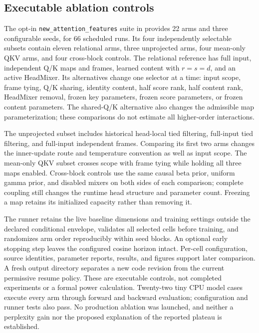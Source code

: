 \documentclass[11pt,letterpaper]{article}
\theoremstyle{remark}
\begin{document}
\subsection{Executable ablation controls}
The opt-in \texttt{new\_attention\_features} suite in  provides 22 arms and three configurable seeds, for 66 scheduled runs. Its four independently selectable subsets contain eleven relational arms, three unprojected arms, four mean-only QKV arms, and four cross-block controls. The relational reference has full input, independent Q/K maps and frames, learned content with $r=s=d$, and an active HeadMixer. Its alternatives change one selector at a time: input scope, frame tying, Q/K sharing, identity content, half score rank, half content rank, HeadMixer removal, frozen key parameters, frozen score parameters, or frozen content parameters. The shared-Q/K alternative also changes the admissible map parameterization; these comparisons do not estimate all higher-order interactions.

The unprojected subset includes historical head-local tied filtering, full-input tied filtering, and full-input independent frames. Comparing its first two arms changes the inner-update route and temperature convention as well as input scope. The mean-only QKV subset crosses scope with frame tying while holding all three maps enabled. Cross-block controls use the same causal beta prior, uniform gamma prior, and disabled mixers on both sides of each comparison; complete coupling still changes the runtime head structure and parameter count. Freezing a map retains its initialized capacity rather than removing it.

The runner retains the live baseline dimensions and training settings outside the declared conditional envelope, validates all selected cells before training, and randomizes arm order reproducibly within seed blocks. An optional early stopping step leaves the configured cosine horizon intact. Per-cell configuration, source identities, parameter reports, results, and figures support later comparison. A fresh output directory separates a new code revision from the current permissive resume policy. These are executable controls, not completed experiments or a formal power calculation. Twenty-two tiny CPU model cases execute every arm through forward and backward evaluation; configuration and runner tests also pass. No production ablation was launched, and neither a perplexity gain nor the proposed explanation of the reported plateau is established.
\end{document}
